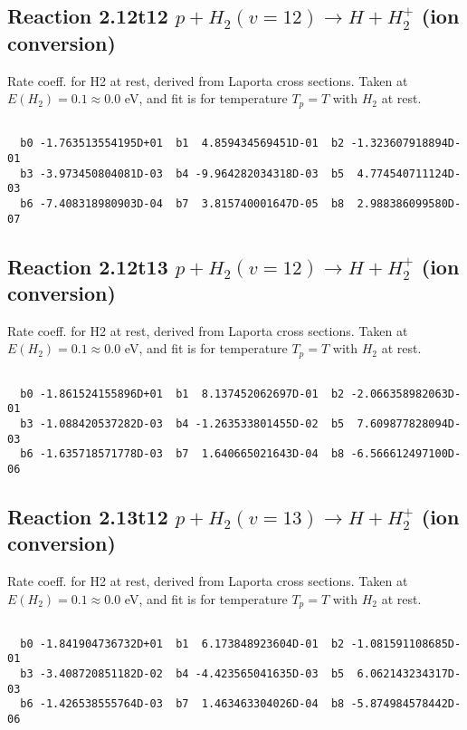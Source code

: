 \newpage
\subsection{
Reaction 2.12t12
$ p + H_2(v=12) \rightarrow H + H_2^+$ (ion conversion)
}
Rate coeff. for H2 at rest, derived from Laporta cross sections.
Taken at $E(H_2) = 0.1 \approx 0.0$ eV,  and fit is for temperature $T_p=T$ with $H_2$ at rest.

\begin{small}\begin{verbatim}

  b0 -1.763513554195D+01  b1  4.859434569451D-01  b2 -1.323607918894D-01
  b3 -3.973450804081D-03  b4 -9.964282034318D-03  b5  4.774540711124D-03
  b6 -7.408318980903D-04  b7  3.815740001647D-05  b8  2.988386099580D-07

\end{verbatim}\end{small}

\newpage
\subsection{
Reaction 2.12t13
$ p + H_2(v=12) \rightarrow H + H_2^+$ (ion conversion)
}
Rate coeff. for H2 at rest, derived from Laporta cross sections.
Taken at $E(H_2) = 0.1 \approx 0.0$ eV,  and fit is for temperature $T_p=T$ with $H_2$ at rest.

\begin{small}\begin{verbatim}

  b0 -1.861524155896D+01  b1  8.137452062697D-01  b2 -2.066358982063D-01
  b3 -1.088420537282D-03  b4 -1.263533801455D-02  b5  7.609877828094D-03
  b6 -1.635718571778D-03  b7  1.640665021643D-04  b8 -6.566612497100D-06

\end{verbatim}\end{small}

\newpage
\subsection{
Reaction 2.13t12
$ p + H_2(v=13) \rightarrow H + H_2^+$ (ion conversion)
}
Rate coeff. for H2 at rest, derived from Laporta cross sections.
Taken at $E(H_2) = 0.1 \approx 0.0$ eV,  and fit is for temperature $T_p=T$ with $H_2$ at rest.

\begin{small}\begin{verbatim}

  b0 -1.841904736732D+01  b1  6.173848923604D-01  b2 -1.081591108685D-01
  b3 -3.408720851182D-02  b4 -4.423565041635D-03  b5  6.062143234317D-03
  b6 -1.426538555764D-03  b7  1.463463304026D-04  b8 -5.874984578442D-06

\end{verbatim}\end{small}

